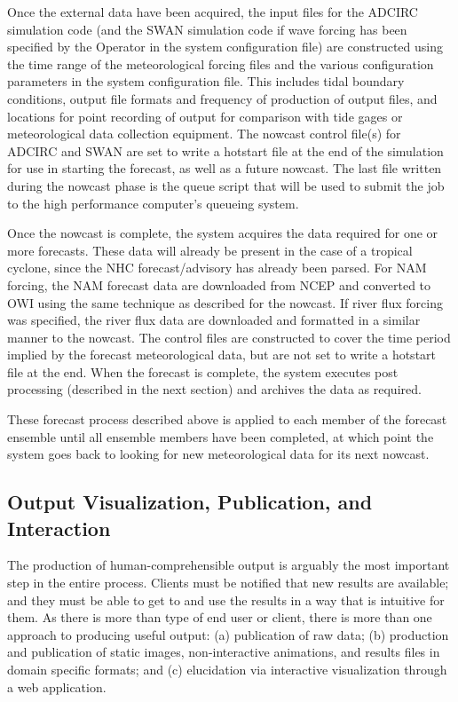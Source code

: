 \documentclass[12pt]{article}
\begin{document}
Once the external data have been acquired, the input files for the 
ADCIRC simulation code (and the SWAN simulation code if wave forcing 
has been specified by the Operator in the system configuration file) 
are constructed using the time range of the meteorological forcing 
files and the various configuration parameters in the system 
configuration file. This includes tidal boundary conditions, output 
file formats and frequency of production of output files, and 
locations for point recording of output for comparison with tide 
gages or meteorological data collection equipment. The nowcast  
control file(s) for ADCIRC and SWAN are set to write a hotstart file 
at the end of the simulation for use in starting the forecast, as 
well as a future nowcast. The last file written during the nowcast 
phase is the queue script that will be used to submit the job to the 
high performance computer's queueing system.

Once the nowcast is complete, the system acquires the data required 
for one or more forecasts. These data will already be present in the 
case of a tropical cyclone, since the NHC forecast/advisory has 
already been parsed. For NAM forcing, the NAM forecast data are 
downloaded from NCEP and converted to OWI using the same technique 
as described for the nowcast. If river flux forcing was specified, 
the river flux data are downloaded and formatted in a similar manner 
to the nowcast. The control files are constructed to cover the time 
period implied by the forecast meteorological data, but are not set 
to write a hotstart file at the end. When the forecast is complete, 
the system executes post processing (described in the next section) 
and archives the data as required. 

These forecast process described above is  applied to  each member 
of the forecast ensemble until all ensemble members have been 
completed, at which point the system goes back to looking for new 
meteorological data for its next nowcast.

\subsection{Output Visualization, Publication, and Interaction}

The production of human-comprehensible output is arguably the most 
important step in the entire process. Clients must be notified that 
new results are available; and they must be able to get to and use 
the results in a way that is  intuitive for them. As there is more 
than type of end user or client, there is more than one approach to 
producing useful output: (a) publication of raw data; (b) production 
and publication of static images, non-interactive animations, and 
results files in domain specific formats; and (c) elucidation via 
interactive visualization through a web application.
\end{document}
